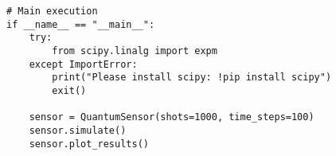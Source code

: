 \documentclass{beamer}
\begin{document}
\begin{frame}
\begin{verbatim}
# Main execution
if __name__ == "__main__":
    try:
        from scipy.linalg import expm
    except ImportError:
        print("Please install scipy: !pip install scipy")
        exit()

    sensor = QuantumSensor(shots=1000, time_steps=100)
    sensor.simulate()
    sensor.plot_results()



\end{verbatim}
\end{frame}
\end{document}
